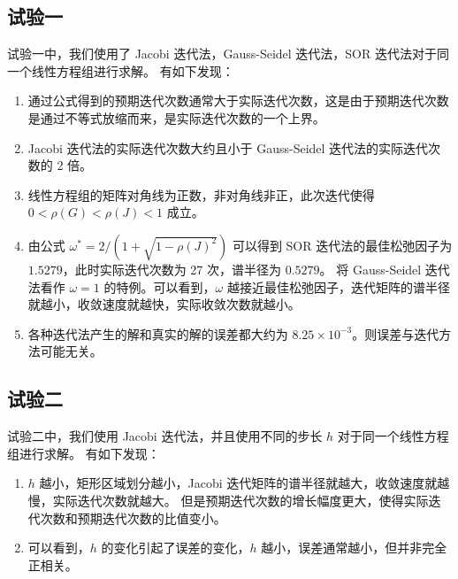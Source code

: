 \documentclass{article}
\begin{document}
\subsection{试验一}
试验一中，我们使用了 Jacobi 迭代法，Gauss-Seidel 迭代法，SOR 迭代法对于同一个线性方程组进行求解。
有如下发现：
\begin{enumerate}
    \item 通过公式得到的预期迭代次数通常大于实际迭代次数，这是由于预期迭代次数是通过不等式放缩而来，是实际迭代次数的一个上界。
    \item Jacobi 迭代法的实际迭代次数大约且小于 Gauss-Seidel 迭代法的实际迭代次数的 2 倍。
    \item 线性方程组的矩阵对角线为正数，非对角线非正，此次迭代使得 $0<\rho(G)<\rho(J)<1$ 成立。
    \item 由公式 $\omega^*=2/(1+\sqrt{1-\rho(J)^2})$ 可以得到 SOR 迭代法的最佳松弛因子为 $1.5279$，此时实际迭代次数为 27 次，谱半径为 $0.5279$。
          将 Gauss-Seidel 迭代法看作 $\omega=1$ 的特例。可以看到，$\omega$ 越接近最佳松弛因子，迭代矩阵的谱半径就越小，收敛速度就越快，实际收敛次数就越小。
    \item 各种迭代法产生的解和真实的解的误差都大约为 $8.25\times10^{-3}$。则误差与迭代方法可能无关。
\end{enumerate}

\subsection{试验二}
试验二中，我们使用 Jacobi 迭代法，并且使用不同的步长 $h$ 对于同一个线性方程组进行求解。
有如下发现：
\begin{enumerate}
    \item $h$ 越小，矩形区域划分越小，Jacobi 迭代矩阵的谱半径就越大，收敛速度就越慢，实际迭代次数就越大。
          但是预期迭代次数的增长幅度更大，使得实际迭代次数和预期迭代次数的比值变小。
    \item 可以看到，$h$ 的变化引起了误差的变化，$h$ 越小，误差通常越小，但并非完全正相关。
\end{enumerate}
\end{document}
